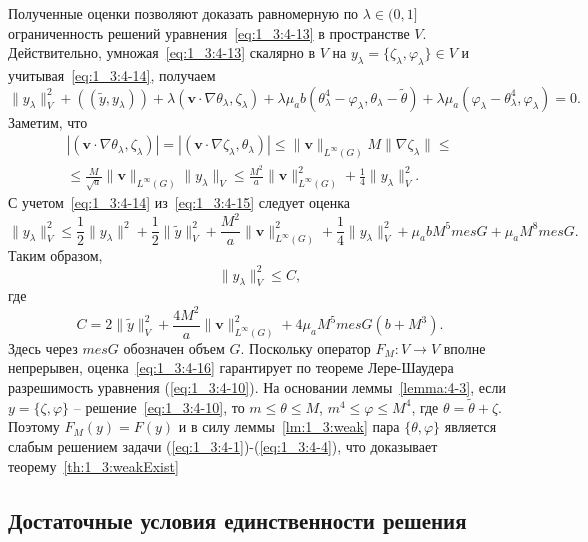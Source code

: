 Полученные оценки позволяют доказать равномерную по $\lambda \in
(0,1]$ ограниченность решений уравнения~\eqref{eq:1_3:4-13} в
пространстве $V$.
Действительно, умножая~\eqref{eq:1_3:4-13} скалярно в
$V$ на $y_{\lambda} = \{\zeta_{\lambda}, \varphi_{\lambda}\} \in V$
и учитывая~\eqref{eq:1_3:4-14}, получаем
\begin{equation}
    \label{eq:1_3:4-15}
    \|y_{\lambda}\|^2_V + ((\widetilde{y}, y_{\lambda})) + \lambda
    (\textbf{v}\cdot \nabla\theta_{\lambda}, \zeta_{\lambda}) +
    \lambda\mu_a b(\theta_{\lambda}^4-\varphi_{\lambda},
    \theta_{\lambda}-\widetilde{\theta}) +\lambda \mu_a
    (\varphi_{\lambda}-\theta_{\lambda}^4, \varphi_{\lambda}) = 0.
\end{equation}
Заметим, что
\begin{gather*}
    |(\textbf{v} \cdot \nabla\theta_{\lambda}, \zeta_{\lambda})|=
    |(\textbf{v} \cdot \nabla\zeta_{\lambda}, \theta_{\lambda})| \leq
    \|\textbf{v}\|_{L^{\infty}(G)} M \|\nabla\zeta_{\lambda}\| \leq \\
    \leq
    \frac{M}{\sqrt{a}}\|\textbf{v}\|_{L^{\infty}(G)}\|y_{\lambda}\|_V
    \leq \frac{M^2}{a}\|\textbf{v}\|^2_{L^{\infty}(G)}
    + \frac{1}{4}\|y_{\lambda}\|^2_V.
\end{gather*}
С учетом~\eqref{eq:1_3:4-14} из~\eqref{eq:1_3:4-15} следует оценка
\[
    \|y_{\lambda}\|^2_V \leq \frac{1}{2} \|y_{\lambda}\|^2 +
    \frac{1}{2} \|\widetilde{y}\|^2_V +
    \frac{M^2}{a}\|\textbf{v}\|^2_{L^{\infty}(G)} +
    \frac{1}{4}\|y_{\lambda}\|^2_V + \mu_a b M^5 mes G + \mu_a M^8 mes
    G.
\]
Таким образом,
\begin{equation}
    \label{eq:1_3:4-16}
    \|y_{\lambda}\|^2_V \leq C,
\end{equation}
где
\[
    C= 2 \|\widetilde{y}\|^2_V +
    \frac{4M^2}{a}\|\textbf{v}\|^2_{L^{\infty}(G)} + 4 \mu_a M^5 mes
    G(b+M^3).
\]
Здесь через $mes G$ обозначен объем $G$.
Поскольку оператор $F_M:
V \to V$ вполне непрерывен, оценка~\eqref{eq:1_3:4-16} гарантирует по
теореме Лере-Шаудера разрешимость уравнения (\ref{eq:1_3:4-10}). На
основании леммы~\ref{lemma:4-3}, если $y=\{\zeta, \varphi\}$ --
решение~\eqref{eq:1_3:4-10}, то $m \leq \theta \leq M$,
$m^4 \leq \varphi \leq M^4$, где $\theta = \widetilde{\theta} + \zeta$.
Поэтому
$F_M(y) = F(y)$ и в силу леммы~\ref{lm:1_3:weak} пара
$\{\theta, \varphi\}$ является слабым решением задачи
(\ref{eq:1_3:4-1})-(\ref{eq:1_3:4-4}), что доказывает теорему~\ref{th:1_3:weakExist}

\subsection{Достаточные условия единственности решения}\label{subsec:ch1/sec3/uniqueness}

